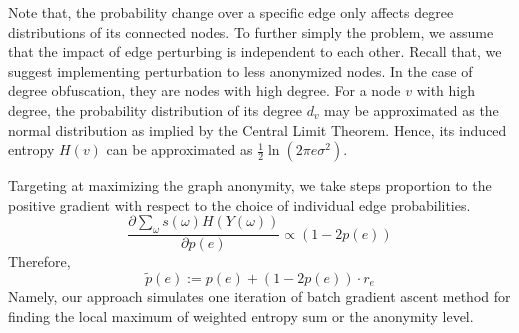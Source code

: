 Note that, the probability change over a specific edge only affects degree distributions of its connected nodes. 
To further simply the problem, we assume that the impact of edge perturbing is independent to each other. Recall that, we suggest implementing perturbation to less anonymized nodes. In the case of degree obfuscation, they are nodes with high degree. For a node $v$ with high degree, the probability distribution of its degree $d_{v}$ may be approximated as the normal distribution as implied by the Central Limit Theorem. Hence, its induced entropy $H(v)$ can be approximated as $\frac{1}{2} {\ln (2 \pi e \sigma^2)}$. 

Targeting at maximizing the graph anonymity, we take steps proportion to the positive gradient with respect to the choice of individual edge probabilities. 
\svj
\begin{equation*}
    \frac{\partial \sum_{\omega} s(\omega) H(Y(\omega))} {\partial p(e)} \propto (1-2\mathit{p}(e))  
\end{equation*} 
Therefore, 
\vj
\begin{equation*}
    \tilde{\mathit{p}}(e):=\mathit{p}(e) + (1-2 \mathit{p}(e)) \cdot r_{e}
\end{equation*} 
Namely, our approach simulates one iteration of batch gradient ascent method for finding the local maximum of weighted entropy sum or the anonymity level. 